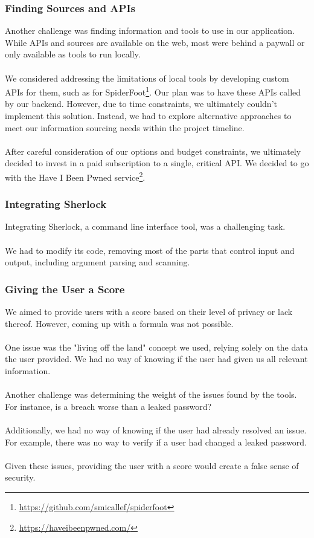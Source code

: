 \documentclass[
    a4paper,
    pagesize,
	pdftex,
    12pt,
]{scrartcl}
\begin{document}
\subsubsection{Finding Sources and APIs}
Another challenge was finding information and tools to use in our application. While APIs and sources are available on the web, most were behind a paywall or only available as tools to run locally.
\\ \\
We considered addressing the limitations of local tools by developing custom APIs for them, such as for SpiderFoot\footnote{\url{https://github.com/smicallef/spiderfoot}}. Our plan was to have these APIs called by our backend. However, due to time constraints, we ultimately couldn't implement this solution. Instead, we had to explore alternative approaches to meet our information sourcing needs within the project timeline.
\\ \\
After careful consideration of our options and budget constraints, we ultimately decided to invest in a paid subscription to a single, critical API. We decided to go with the Have I Been Pwned service\footnote{\url{https://haveibeenpwned.com/}}.

\subsubsection{Integrating Sherlock}
Integrating Sherlock, a command line interface tool, was a challenging task.
\\ \\
We had to modify its code, removing most of the parts that control input and output, including argument parsing and scanning.

\subsubsection{Giving the User a Score}
We aimed to provide users with a score based on their level of privacy or lack thereof.  However, coming up with a formula was not possible.
\\ \\
One issue was the "living off the land" concept we used, relying solely on the data the user provided. We had no way of knowing if the user had given us all relevant information.
\\ \\
Another challenge was determining the weight of the issues found by the tools. For instance, is a breach worse than a leaked password?
\\ \\
Additionally, we had no way of knowing if the user had already resolved an issue. For example, there was no way to verify if a user had changed a leaked password.
\\ \\
Given these issues, providing the user with a score would create a false sense of security.
\end{document}
